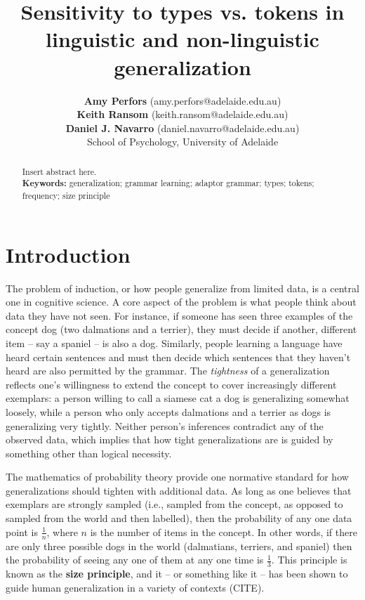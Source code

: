 \documentclass[10pt,letterpaper]{article}
\title{Sensitivity to types vs. tokens in linguistic and non-linguistic generalization}
\author{{\bf Amy Perfors} (amy.perfors@adelaide.edu.au) \\
   {\bf Keith Ransom} (keith.ransom@adelaide.edu.au) \\
   {\bf Daniel J. Navarro} (daniel.navarro@adelaide.edu.au) \\
   School of Psychology, University of Adelaide}
\begin{document}
\maketitle


\begin{abstract}
Insert abstract here.\\
\textbf{Keywords:} 
generalization; grammar learning; adaptor grammar; types; tokens; frequency; size principle
\end{abstract}


\section*{Introduction}

The problem of induction, or how people generalize from limited data, is a central one in cognitive science. A core aspect of the problem is what people think about data they have not seen. For instance, if someone has seen three examples of the concept {\sc dog} (two dalmations and a terrier), they must decide if another, different item -- say a spaniel -- is also a dog.  Similarly, people learning a language have heard certain sentences and must then decide which sentences that they haven't heard are also permitted by the grammar. The {\it tightness} of a generalization reflects one's willingness to extend the concept to cover increasingly different exemplars: a person willing to call a siamese cat a dog is generalizing somewhat loosely, while a person who only accepts dalmations and a terrier as dogs is generalizing very tightly. Neither person's inferences contradict any of the observed data, which implies that how tight generalizations are is guided by something other than logical necessity. 

The mathematics of probability theory provide one normative standard for how generalizations should tighten with additional data. As long as one believes that exemplars are strongly sampled (i.e., sampled from the concept, as opposed to sampled from the world and then labelled), then the probability of any one data point is $\frac{1}{n}$, where $n$ is the number of items in the concept. In other words, if there are only three possible {\sc dogs} in the world (dalmatians, terriers, and spaniel) then the probability of seeing any one of them at any one time is $\frac{1}{3}$. This principle is known as the {\bf size principle}, and it -- or something like it -- has been shown to guide human generalization in a variety of contexts (CITE).
\end{document}
